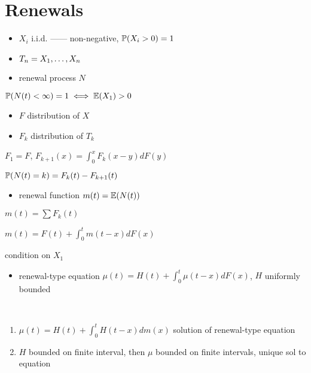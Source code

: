 \section{Renewals}\label{sec:renewals}

\begin{itemize}
    \item $X_i$ i.i.d. ------ non-negative, $\mathbb{P}(X_i > 0) = 1$
    \item $T_n = \ddd{X}$
    \item renewal process $N$
\end{itemize}

\begin{thm}
    $\mathbb{P}(N(t) < \infty) = 1 \iff \mathbb{E}(X_1) > 0$
\end{thm}

\begin{itemize}
    \item $F$ distribution of $X$
    \item $F_k$ distribution of $T_k$
\end{itemize}

\begin{lemma}
    $F_1 = F$, $F_{k+1}(x) = \int_0^x F_k(x - y)dF(y)$
\end{lemma}

\begin{lemma}
    $\mathbb{P}(N(t) = k) = F_k(t) - F_{k+1}(t)$
\end{lemma}

\begin{itemize}
    \item renewal function $m(t) = \mathbb{E}(N(t))$
\end{itemize}

\begin{lemma}
    $m(t) = \sum F_k(t)$
\end{lemma}

\begin{lemma}
    $m(t) = F(t) + \int^t_0 m(t- x)dF(x)$
\end{lemma}
\begin{pf}
    condition on $X_1$
\end{pf}

\begin{itemize}
    \item renewal-type equation $\mu(t) = H(t) + \int^{t}_0 \mu(t-x)dF(x)$, $H$ uniformly bounded
\end{itemize}

\begin{thm}\,
    \begin{enumerate}
        \item $\mu(t) = H(t) + \int_0^t H(t - x)dm(x)$ solution of renewal-type equation
        \item $H$ bounded on finite interval, then $\mu$ bounded on finite intervals, unique sol to equation
    \end{enumerate}
\end{thm}

